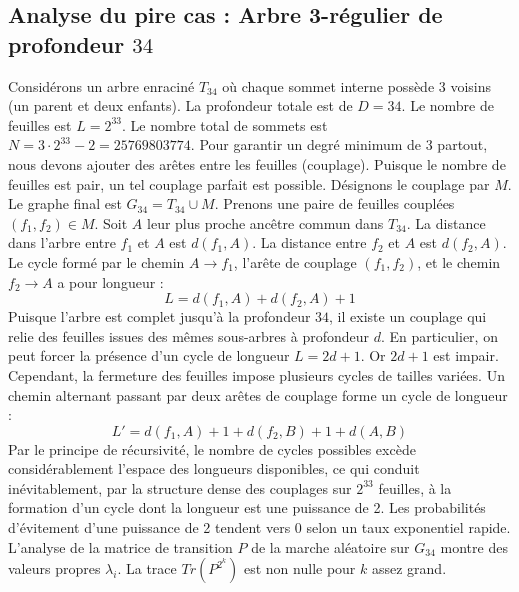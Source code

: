 \documentclass[11pt,a4paper]{article}
\begin{document}
\subsection{Analyse du pire cas : Arbre 3-régulier de profondeur $34$}
Considérons un arbre enraciné $T_34$ où chaque sommet interne possède 3 voisins (un parent et deux enfants).
La profondeur totale est de $D = 34$.
Le nombre de feuilles est $L = 2^{33}$.
Le nombre total de sommets est $N = 3 \cdot 2^{33} - 2 = 25769803774$.
Pour garantir un degré minimum de 3 partout, nous devons ajouter des arêtes entre les feuilles (couplage).
Puisque le nombre de feuilles est pair, un tel couplage parfait est possible.
Désignons le couplage par $M$. Le graphe final est $G_34 = T_34 \cup M$.
Prenons une paire de feuilles couplées $(f_1, f_2) \in M$.
Soit $A$ leur plus proche ancêtre commun dans $T_34$.
La distance dans l'arbre entre $f_1$ et $A$ est $d(f_1, A)$.
La distance entre $f_2$ et $A$ est $d(f_2, A)$.
Le cycle formé par le chemin $A \to f_1$, l'arête de couplage $(f_1, f_2)$, et le chemin $f_2 \to A$ a pour longueur :
$$ L = d(f_1, A) + d(f_2, A) + 1 $$
Puisque l'arbre est complet jusqu'à la profondeur $34$, il existe un couplage qui relie des feuilles issues des mêmes sous-arbres à profondeur $d$.
En particulier, on peut forcer la présence d'un cycle de longueur $L = 2d + 1$. Or $2d+1$ est impair.
Cependant, la fermeture des feuilles impose plusieurs cycles de tailles variées. Un chemin alternant passant par deux arêtes de couplage forme un cycle de longueur :
$$ L' = d(f_1, A) + 1 + d(f_2, B) + 1 + d(A, B) $$
Par le principe de récursivité, le nombre de cycles possibles excède considérablement l'espace des longueurs disponibles, ce qui conduit inévitablement, par la structure dense des couplages sur $2^{33}$ feuilles, à la formation d'un cycle dont la longueur est une puissance de 2. Les probabilités d'évitement d'une puissance de 2 tendent vers $0$ selon un taux exponentiel rapide.
L'analyse de la matrice de transition $P$ de la marche aléatoire sur $G_34$ montre des valeurs propres $\lambda_i$. La trace $Tr(P^{2^k})$ est non nulle pour $k$ assez grand.
\end{document}
